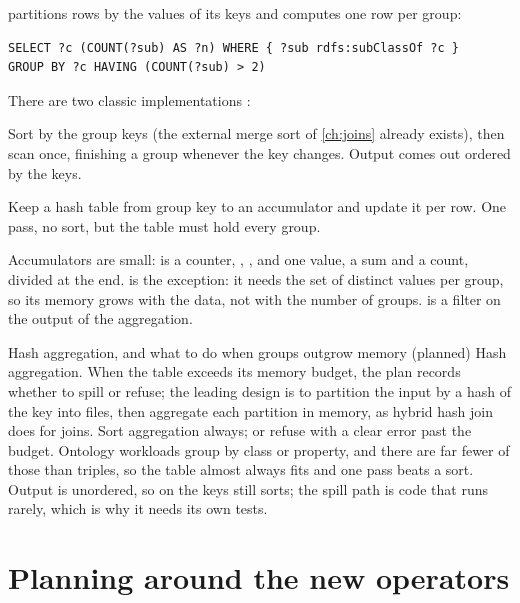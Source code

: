  partitions rows by the values of its keys and computes one row
per group:
\begin{lstlisting}
SELECT ?c (COUNT(?sub) AS ?n) WHERE { ?sub rdfs:subClassOf ?c }
GROUP BY ?c HAVING (COUNT(?sub) > 2)
\end{lstlisting}
There are two classic implementations \cite{graefe}:
\begin{description}[leftmargin=1.2em]
\item[Sort aggregation.] Sort by the group keys (the external merge sort of
\cref{ch:joins} already exists), then scan once, finishing a group whenever the
key changes. Output comes out ordered by the keys.
\item[Hash aggregation.] Keep a hash table from group key to an accumulator and
update it per row. One pass, no sort, but the table must hold every group.
\end{description}
Accumulators are small:  is a counter, , , and
 one value,  a sum and a count, divided at the end.
 is the exception: it needs the set of distinct values
per group, so its memory grows with the data, not with the number of groups.
 is a filter on the output of the aggregation.

\begin{decision}{Hash aggregation, and what to do when groups outgrow memory (planned)}
 Hash aggregation. When the table exceeds its memory budget,
the plan records whether to spill or refuse; the leading design is to partition
the input by a hash of the key into files, then aggregate each partition in
memory, as hybrid hash join does for joins.
 Sort aggregation always; or refuse with a clear error past
the budget.
 Ontology workloads group by class or property, and there are far
fewer of those than triples, so the table almost always fits and one pass
beats a sort.
 Output is unordered, so  on the keys still sorts;
the spill path is code that runs rarely, which is why it needs its own tests.
\end{decision}

\section{Planning around the new operators}

